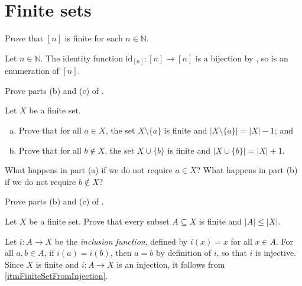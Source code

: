 \section{Finite sets}


\begin{exercise}
\label{exBracketNIsFinite}
Prove that $[n]$ is finite for each $n \in \mathbb{N}$.
\end{exercise}

\begin{solutions*}
Let $n \in \mathbb{N}$. The identity function $\mathrm{id}_{[n]} : [n] \to [n]$ is a bijection by , so is an enumeration of $[n]$.
\end{solutions*}


\begin{exercise}
Prove parts (b) and (c) of .
\end{exercise}


\begin{exercise}
\label{exAddRemoveElementsOfFiniteSets}
Let $X$ be a finite set.
\begin{enumerate}[(a)]
\item Prove that for all $a \in X$, the set $X \setminus \{ a \}$ is finite and $|X \setminus \{ a \}| = |X|-1$; and
\item Prove that for all $b \not\in X$, the set $X \cup \{ b \}$ is finite and $|X \cup \{ b \}| = |X|+1$.
\end{enumerate}
What happens in part (a) if we do not require $a \in X$? What happens in part (b) if we do not require $b \not\in X$?
\end{exercise}


\begin{exercise}
Prove parts (b) and (c) of .
\end{exercise}

\begin{exercise}
Let $X$ be a finite set. Prove that every subset $A \subseteq X$ is finite and $|A| \le |X|$.
\end{exercise}

\begin{solutions*}
Let $i : A \to X$ be the \textit{inclusion function}, defined by $i(x)=x$ for all $x \in A$. For all $a,b \in A$, if $i(a)=i(b)$, then $a=b$ by definition of $i$, so that $i$ is injective. Since $X$ is finite and $i : A \to X$ is an injection, it follows from \ref{itmFiniteSetFromInjection}.
\end{solutions*}

